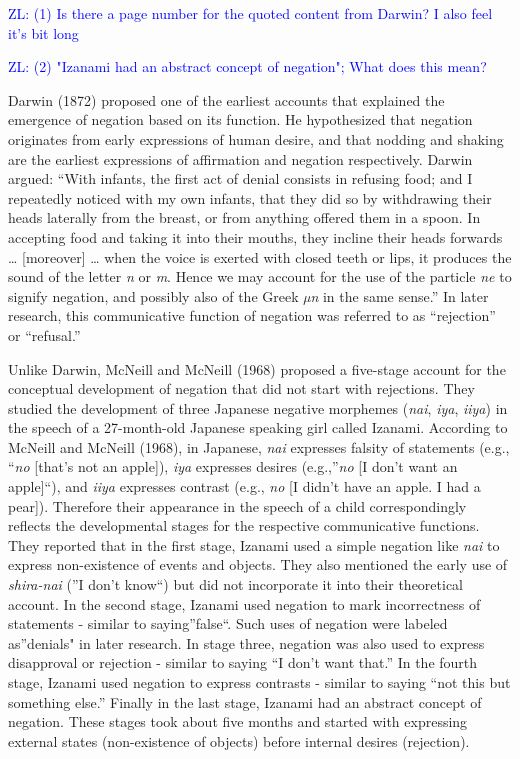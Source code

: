 \documentclass[
  english,
  man,floatsintext]{apa6}
\begin{document}
\textcolor{blue}{ZL: (1) Is there a page number for the quoted content from Darwin? I also feel it's bit long}

\textcolor{blue}{ZL: (2) "Izanami had an abstract concept of negation"; What does this mean?}

Darwin (1872) proposed one of the earliest accounts that explained the emergence of negation based on its function. He hypothesized that negation originates from early expressions of human desire, and that nodding and shaking are the earliest expressions of affirmation and negation respectively. Darwin argued: ``With infants, the first act of denial consists in refusing food; and I repeatedly noticed with my own infants, that they did so by withdrawing their heads laterally from the breast, or from anything offered them in a spoon. In accepting food and taking it into their mouths, they incline their heads forwards \ldots{} {[}moreover{]} \ldots{} when the voice is exerted with closed teeth or lips, it produces the sound of the letter \emph{n} or \emph{m}. Hence we may account for the use of the particle \emph{ne} to signify negation, and possibly also of the Greek \emph{µn} in the same sense.'' In later research, this communicative function of negation was referred to as ``rejection'' or ``refusal.''

Unlike Darwin, McNeill and McNeill (1968) proposed a five-stage account for the conceptual development of negation that did not start with rejections. They studied the development of three Japanese negative morphemes (\emph{nai}, \emph{iya}, \emph{iiya}) in the speech of a 27-month-old Japanese speaking girl called Izanami. According to McNeill and McNeill (1968), in Japanese, \emph{nai} expresses falsity of statements (e.g., ``\emph{no} {[}that's not an apple{]}), \emph{iya} expresses desires (e.g.,''\emph{no} {[}I don't want an apple{]}``), and \emph{iiya} expresses contrast (e.g., \emph{no} {[}I didn't have an apple. I had a pear{]}). Therefore their appearance in the speech of a child correspondingly reflects the developmental stages for the respective communicative functions. They reported that in the first stage, Izanami used a simple negation like \emph{nai} to express non-existence of events and objects. They also mentioned the early use of \emph{shira-nai} (''I don't know``) but did not incorporate it into their theoretical account. In the second stage, Izanami used negation to mark incorrectness of statements - similar to saying''false``. Such uses of negation were labeled as''denials" in later research. In stage three, negation was also used to express disapproval or rejection - similar to saying ``I don't want that.'' In the fourth stage, Izanami used negation to express contrasts - similar to saying ``not this but something else.'' Finally in the last stage, Izanami had an abstract concept of negation. These stages took about five months and started with expressing external states (non-existence of objects) before internal desires (rejection).
\end{document}
